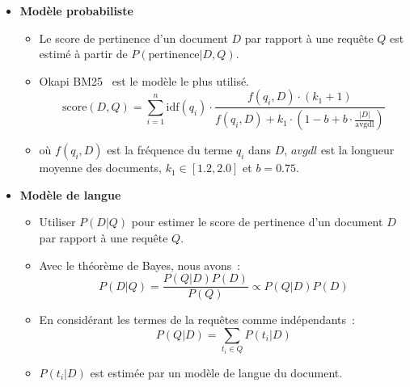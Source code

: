 \documentclass[12pt,aspectratio=43,dvipsnames,table]{beamer}
\begin{document}
\begin{frame}[allowframebreaks]
\begin{itemize}
        \framebreak

        \item \textbf{Modèle probabiliste}~\cite{robertson1976relevance}
         \begin{itemize}
            \item Le score de pertinence d'un document $D$ par rapport à une 
                  requête $Q$ est estimé à partir de $P(\text{pertinence}|D,Q)$.
            \item Okapi BM25~\cite{DBLP:conf/trec/RobertsonWHGL92} est le modèle 
                  le plus utilisé.
            \begin{equation*}
              \text{score}(D,Q) = \sum_{i=1}^{n} \text{idf}(q_i) \cdot 
              \frac{f(q_i, D) \cdot (k_1 + 1)}
              {f(q_i, D) + k_1 \cdot (1 - b + b \cdot \frac{|D|}{\text{avgdl}})}
            \end{equation*}
            \item où $f(q_i, D)$ est la fréquence du terme $q_i$ dans $D$, 
                  $avgdl$ est la longueur moyenne des documents, 
                  $k_1 \in [1.2,2.0]$ et $b = 0.75$.
        \end{itemize}

        \framebreak

        \item \textbf{Modèle de langue}~\cite{DBLP:conf/sigir/PonteC98}
        \begin{itemize}
            \item Utiliser $P(D|Q)$ pour estimer le score de pertinence d'un 
                  document $D$ par rapport à une requête $Q$.
            \item Avec le théorème de Bayes, nous avons~:
            \begin{equation*}
              P(D|Q) = \frac{P(Q|D)P(D)}{P(Q)} \propto P(Q|D)P(D)
            \end{equation*}
            \item En considérant les termes de la requêtes comme indépendants~:
            \begin{equation*}
              P(Q|D) = \sum_{t_i \in Q} P(t_i | D)
            \end{equation*}
            \item $P(t_i | D)$ est estimée par un modèle de langue du document.
        \end{itemize}

    \end{itemize}
\end{frame}
\end{document}
